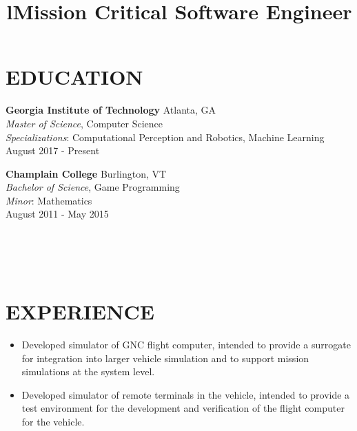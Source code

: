 \documentclass[margin]{res}
\begin{document}
\begin{resume}

\section{EDUCATION}
\phantom{spacing}
\textbf{Georgia Institute of Technology} \hfill Atlanta, GA\\
{\sl Master of Science}, Computer Science
\\
{\sl Specializations}: Computational Perception and Robotics, Machine Learning
\\
August 2017 - Present

\par
\textbf{Champlain College} \hfill Burlington, VT\\
{\sl Bachelor of Science}, Game Programming
\\
{\sl Minor}: Mathematics
\\
August 2011 - May 2015

\begin{format}
\title{l}\\
\\
\body\\
\end{format}

\section{EXPERIENCE}
\phantom{spacing}
\title{\textbf{Mission Critical Software Engineer}}
\begin{position}\phantom{spacing}
\begin{itemize}[noitemsep, topsep=0pt]
\item Developed simulator of GNC flight computer, intended to provide a surrogate for integration into larger vehicle simulation and to support mission simulations at the system level.
\item Developed simulator of remote terminals in the vehicle, intended to provide a test environment for the development and verification of the flight computer for the vehicle.
\end{itemize}
\end{position}


\end{resume}
\end{document}

